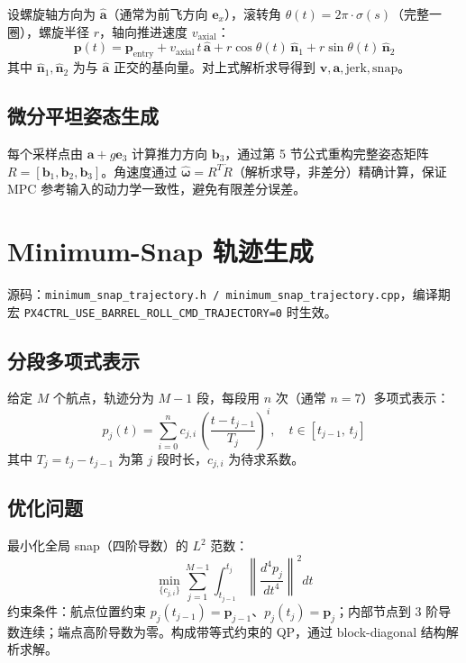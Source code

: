 \documentclass[UTF8, a4paper, 11pt]{ctexart}
\newcommand{\bp}{\mathbf{p}}
\newcommand{\bv}{\mathbf{v}}
\newcommand{\bw}{\boldsymbol{\omega}}
\newcommand{\hhat}[1]{\widehat{#1}}
\begin{document}
设螺旋轴方向为 $\hat{\mathbf{a}}$（通常为前飞方向 $\mathbf{e}_x$），滚转角 $\theta(t) = 2\pi\cdot\sigma(s)$（完整一圈），螺旋半径 $r$，轴向推进速度 $v_{\text{axial}}$：
\begin{equation}
  \bp(t) = \bp_{\text{entry}} + v_{\text{axial}}\,t\,\hat{\mathbf{a}} + r\cos\theta(t)\,\hat{\mathbf{n}}_1 + r\sin\theta(t)\,\hat{\mathbf{n}}_2
\end{equation}
其中 $\hat{\mathbf{n}}_1, \hat{\mathbf{n}}_2$ 为与 $\hat{\mathbf{a}}$ 正交的基向量。对上式解析求导得到 $\bv, \mathbf{a}, \text{jerk}, \text{snap}$。

\subsection{微分平坦姿态生成}

每个采样点由 $\mathbf{a}+g\mathbf{e}_3$ 计算推力方向 $\mathbf{b}_3$，通过第 5 节公式重构完整姿态矩阵 $R = [\mathbf{b}_1,\mathbf{b}_2,\mathbf{b}_3]$。角速度通过 $\hhat{\bw} = R^T\dot{R}$（解析求导，非差分）精确计算，保证 MPC 参考输入的动力学一致性，避免有限差分误差。

\section{Minimum-Snap 轨迹生成}

源码：\texttt{minimum\_snap\_trajectory.h / minimum\_snap\_trajectory.cpp}，编译期宏 \texttt{PX4CTRL\_USE\_BARREL\_ROLL\_CMD\_TRAJECTORY=0} 时生效。

\subsection{分段多项式表示}

给定 $M$ 个航点，轨迹分为 $M-1$ 段，每段用 $n$ 次（通常 $n=7$）多项式表示：
\begin{equation}
  p_j(t) = \sum_{i=0}^{n} c_{j,i}\,\left(\frac{t-t_{j-1}}{T_j}\right)^i, \quad t\in[t_{j-1},\,t_j]
\end{equation}
其中 $T_j = t_j - t_{j-1}$ 为第 $j$ 段时长，$c_{j,i}$ 为待求系数。

\subsection{优化问题}

最小化全局 snap（四阶导数）的 $L^2$ 范数：
\begin{equation}
  \min_{\{c_{j,i}\}} \sum_{j=1}^{M-1}\int_{t_{j-1}}^{t_j} \left\|\frac{d^4 p_j}{dt^4}\right\|^2 dt
\end{equation}
约束条件：航点位置约束 $p_j(t_{j-1})=\bp_{j-1}$、$p_j(t_j)=\bp_j$；内部节点到 3 阶导数连续；端点高阶导数为零。构成带等式约束的 QP，通过 block-diagonal 结构解析求解。
\end{document}
